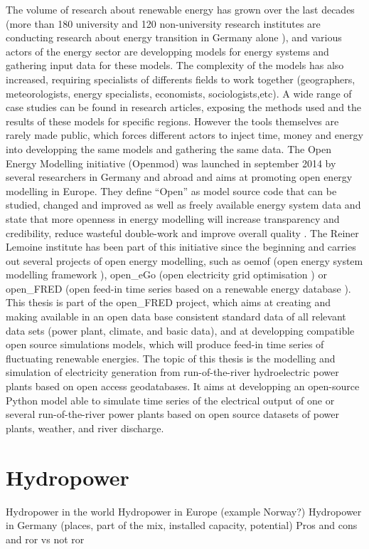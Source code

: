 The volume of research about renewable energy has grown over the last decades (more than 180 university and 120 non-university research institutes are conducting research about energy transition in Germany alone \cite{bmbf_energiewende}), and various actors of the energy sector are developping models for energy systems and gathering input data for these models. The complexity of the models has also increased, requiring specialists of differents fields to work together (geographers, meteorologists, energy specialists, economists, sociologists,etc). A wide range of case studies can be found in research articles, exposing the methods used and the results of these models for specific regions. However the tools themselves are rarely made public, which forces different actors to inject time, money and energy into developping the same models and gathering the same data. \newline
The Open Energy Modelling initiative (Openmod) was launched in september 2014 by several researchers in Germany and abroad \cite{openmod_workshop} and aims at promoting open energy modelling in Europe. They define “Open” as model source code that can be studied, changed and improved as well as freely available energy system data and state that more openness in energy modelling will increase transparency and credibility, reduce wasteful double-work and improve overall quality \cite{openmod_manifesto}. \newline
The Reiner Lemoine institute has been part of this initiative since the beginning and  carries out several projects of open energy modelling, such as oemof (open energy system modelling framework \cite{rli_oemof}), open\_eGo (open electricity grid optimisation \cite{rli_openego}) or open\_FRED (open feed-in time series based on a renewable energy database \cite{rli_openfred}). This thesis is part of the open\_FRED project, which aims at creating and making available in an open data base consistent standard data of all relevant data sets (power plant, climate, and basic data), and at developping compatible open source simulations models, which will produce feed-in time series of fluctuating renewable energies. \newline
The topic of this thesis is the modelling and simulation of electricity generation from run-of-the-river hydroelectric power plants based on open access geodatabases. It aims at developping an open-source Python model able to simulate time series of the electrical output of one or several run-of-the-river power plants based on open source datasets of power plants, weather, and river discharge.


\section{Hydropower}
Hydropower in the world \newline
Hydropower in Europe (example Norway?) \newline
Hydropower in Germany (places, part of the mix, installed capacity, potential) \newline
Pros and cons and ror vs not ror \newline



